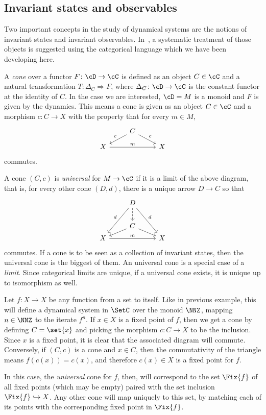 \documentclass[../main]{subfiles}
\begin{document}

\subsection{Invariant states and observables}

Two important concepts in the study of dynamical systems are the notions of invariant states and invariant observables. In~\cite{mossCategorytheoreticProofErgodic2023}, a systematic treatment of those objects is suggested using the categorical language which we have been developing here.

A \emph{cone} over a functor \(F \colon \cD \to \cC\) is defined as an object \(C \in \cC\) and a natural transformation \(T \colon \Delta_C \Rightarrow F\), where \(\Delta_C \colon \cD \to \cC\) is the constant functor at the identity of \(C\). In the case we are interested, \(\cD = M\) is a monoid and \(F\) is given by the dynamics. This means a cone is given as an object \(C \in \cC\) and a morphism \(c \colon C \to X\) with the property that for every \(m \in M\),
\[
  \begin{tikzcd}
    &\arrow[dl, "c", swap]C\arrow[dr, "c"]& \\[-10pt]
    X\arrow[rr,"m"] && X
  \end{tikzcd}
\]
commutes. 

A cone \((C, c)\) is \emph{universal} for \(M \to \cC\) if it is a limit of the above diagram, that is, for every other cone \((D, d)\), there is a unique arrow \(D \to C\) so that
\[
  \begin{tikzcd}
    &\arrow[ddl, "d", swap]D\arrow[d,dashed]\arrow[ddr, "d"]& \\
    &\arrow[dl]C\arrow[dr]& \\[-15pt]
    X\arrow[rr,"m"] && X
  \end{tikzcd}
\]
commutes. If a cone is to be seen as a collection of invariant states, then the universal cone is the biggest of them. An universal cone is a special case of a \emph{limit}. Since categorical limits are unique, if a universal cone exists, it is unique up to isomorphism as well.

\begin{example}
  Let \(f \colon X \to X\) be any function from a set to itself. Like in previous example, this will define a dynamical system in \(\SetC\) over the monoid \(\NNZ\), mapping \(n \in \NNZ\) to the iterate \(f^n\). If \(x \in X\) is a fixed point of \(f\), then we get a cone by defining \(C = \set{x}\) and picking the morphism \(c \colon C \to X\) to be the inclusion. Since \(x\) is a fixed point, it is clear that the associated diagram will commute. Conversely, if \((C,c)\) is a cone and \(x \in C\), then the commutativity of the triangle means \(f(c(x)) = c(x)\), and therefore \(c(x) \in X\) is a fixed point for \(f\).

  In this case, the \emph{universal} cone for \(f\), then, will correspond to the set \(\Fix{f}\) of all fixed points (which may be empty) paired with the set inclusion \(\Fix{f} \hookrightarrow X\). Any other cone will map uniquely to this set, by matching each of its points with the corresponding fixed point in \(\Fix{f}\).
\end{example}
\end{document}
